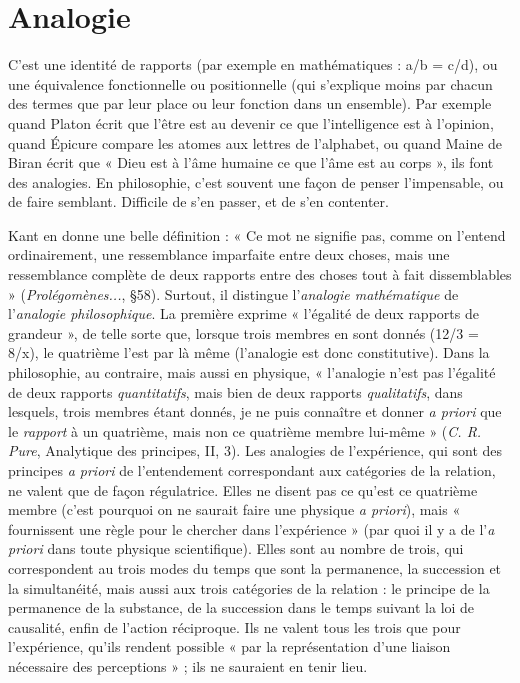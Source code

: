 \section{Analogie}
C’est une identité de rapports (par exemple en mathématiques :
a/b = c/d), ou une équivalence fonctionnelle ou positionnelle
(qui s'explique moins par chacun des termes que par leur place ou leur fonction
dans un ensemble). Par exemple quand Platon écrit que l’être est au devenir ce
que l'intelligence est à l'opinion, quand Épicure compare les atomes aux lettres
de l’alphabet, ou quand Maine de Biran écrit que « Dieu est à l’âme humaine
ce que l’âme est au corps », ils font des analogies. En philosophie, c’est souvent
une façon de penser l’impensable, ou de faire semblant. Difficile de s’en passer,
et de s’en contenter.

Kant en donne une belle définition : « Ce mot ne signifie pas, comme on
l'entend ordinairement, une ressemblance imparfaite entre deux choses, mais
une ressemblance complète de deux rapports entre des choses tout à fait
dissemblables » ({\it Prolégomènes...}, \S 58). Surtout, il distingue l’{\it analogie mathématique}
de l’{\it analogie philosophique}. La première exprime « l'égalité de deux rapports
de grandeur », de telle sorte que, lorsque trois membres en sont donnés
(12/3 = 8/x), le quatrième l’est par là même (l’analogie est donc constitutive).
Dans la philosophie, au contraire, mais aussi en physique, « l’analogie n’est pas
l'égalité de deux rapports {\it quantitatifs}, mais bien de deux rapports {\it qualitatifs},
dans lesquels, trois membres étant donnés, je ne puis connaître et donner {\it a
priori} que le {\it rapport} à un quatrième, mais non ce quatrième membre lui-même »
({\it C. R. Pure}, Analytique des principes, II, 3). Les analogies de l’expérience,
qui sont des principes {\it a priori} de l’entendement correspondant aux catégories
de la relation, ne valent que de façon régulatrice. Elles ne disent pas ce
qu’est ce quatrième membre (c’est pourquoi on ne saurait faire une physique {\it a
priori}), mais « fournissent une règle pour le chercher dans l'expérience » (par
quoi il y a de l’{\it a priori} dans toute physique scientifique). Elles sont au nombre
de trois, qui correspondent au trois modes du temps que sont la permanence,
la succession et la simultanéité, mais aussi aux trois catégories de la relation : le
principe de la permanence de la substance, de la succession dans le temps suivant
la loi de causalité, enfin de l’action réciproque. Ils ne valent tous les trois
que pour l'expérience, qu’ils rendent possible « par la représentation d’une
liaison nécessaire des perceptions » ; ils ne sauraient en tenir lieu.

